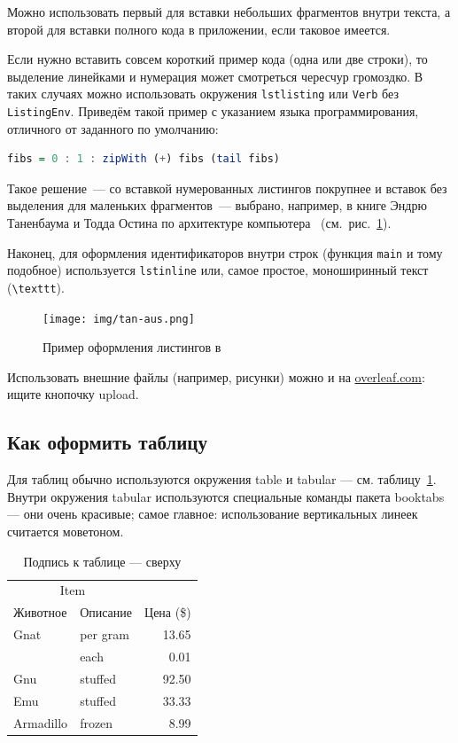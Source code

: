 Можно использовать первый для вставки небольших фрагментов
внутри текста, а второй для вставки полного
кода в приложении, если таковое имеется.

Если нужно вставить совсем короткий пример кода (одна или две строки), то выделение  линейками и нумерация может смотреться чересчур громоздко. В таких случаях можно использовать окружения \texttt{lstlisting} или \texttt{Verb} без \texttt{ListingEnv}. Приведём такой пример с указанием языка программирования, отличного от заданного по умолчанию:
\begin{lstlisting}[language=Haskell]
fibs = 0 : 1 : zipWith (+) fibs (tail fibs)
\end{lstlisting}
Такое решение~--- со вставкой нумерованных листингов покрупнее
и вставок без выделения для маленьких фрагментов~--- выбрано,
например, в книге Эндрю Таненбаума и Тодда Остина по архитектуре
компьютера~\autocite{TanAus2013} (см.~рис.~\ref{fig:tan-aus}).

Наконец, для оформления идентификаторов внутри строк
(функция \lstinline{main} и тому подобное) используется
\texttt{lstinline} или, самое простое, моноширинный текст
(\texttt{\textbackslash texttt}).

\begin{figure}[p]%
\centering
\texttt{[image: img/tan-aus.png]}
\caption{\label{fig:tan-aus}Пример оформления листингов в~\autocite{TanAus2013}}
\end{figure}

Использовать внешние файлы (например, рисунки) можно и на \href{http://overleaf.com}{overleaf.com}: ищите кнопочку upload.

\subsection{Как оформить таблицу}

Для таблиц обычно используются окружения table и tabular --- см. таблицу~\ref{tab:widgets}. Внутри окружения tabular используются специальные команды пакета booktabs — они очень красивые; самое главное: использование вертикальных линеек считается моветоном.

\begin{table}
\centering
\caption{\label{tab:widgets}Подпись к таблице --- сверху}
\begin{tabular}{llr}
\toprule
\multicolumn{2}{c}{Item} \\
\cmidrule(r){1-2}
Животное  & Описание    & Цена (\$) \\
\midrule
Gnat      & per gram    & 13.65      \\
          & each        & 0.01       \\
Gnu       & stuffed     & 92.50      \\
Emu       & stuffed     & 33.33      \\
Armadillo & frozen      & 8.99       \\
\bottomrule
\end{tabular}
\end{table}


